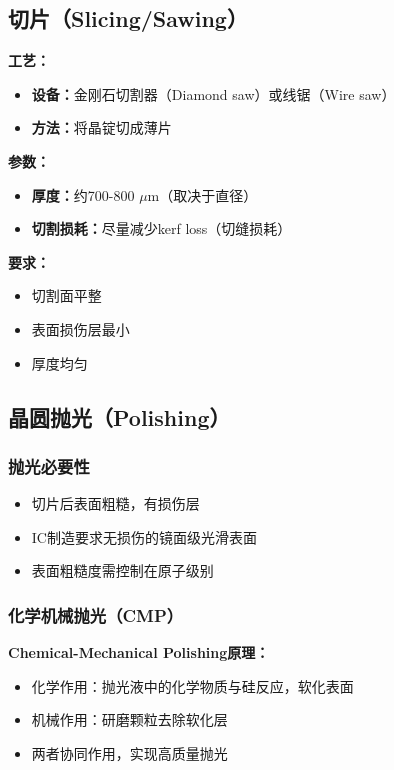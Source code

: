 \documentclass[UTF8,12pt,a4paper]{ctexart}
\begin{document}
\subsection{切片（Slicing/Sawing）}

\textbf{工艺：}
\begin{itemize}
    \item \textbf{设备：}金刚石切割器（Diamond saw）或线锯（Wire saw）
    \item \textbf{方法：}将晶锭切成薄片
\end{itemize}

\textbf{参数：}
\begin{itemize}
    \item \textbf{厚度：}约700-800 $\mu$m（取决于直径）
    \item \textbf{切割损耗：}尽量减少kerf loss（切缝损耗）
\end{itemize}

\textbf{要求：}
\begin{itemize}
    \item 切割面平整
    \item 表面损伤层最小
    \item 厚度均匀
\end{itemize}

\subsection{晶圆抛光（Polishing）}

\subsubsection{抛光必要性}

\begin{itemize}
    \item 切片后表面粗糙，有损伤层
    \item IC制造要求无损伤的镜面级光滑表面
    \item 表面粗糙度需控制在原子级别
\end{itemize}

\subsubsection{化学机械抛光（CMP）}

\textbf{Chemical-Mechanical Polishing原理：}
\begin{itemize}
    \item 化学作用：抛光液中的化学物质与硅反应，软化表面
    \item 机械作用：研磨颗粒去除软化层
    \item 两者协同作用，实现高质量抛光
\end{itemize}
\end{document}
